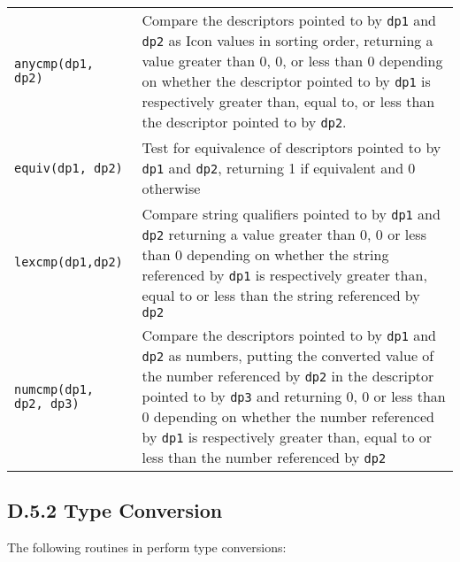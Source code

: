 \begin{xtabular}{l@{\hspace{1cm}}p{11cm}}

\texttt{anycmp(dp1, dp2)} &
Compare the descriptors pointed to by \texttt{dp1} and \texttt{dp2} as Icon
values in sorting order, returning a value greater than 0, 0, or less than 0
depending on whether the descriptor pointed to by \texttt{dp1} is respectively greater
than, equal to, or less than the descriptor pointed to by \texttt{dp2}.\\

\texttt{equiv(dp1, dp2)} &
Test for equivalence of descriptors pointed to by \texttt{dp1} and \texttt{dp2},
returning 1 if equivalent and 0 otherwise\\

\texttt{lexcmp(dp1,dp2)} &
Compare string qualifiers pointed to by \texttt{dp1} and \texttt{dp2} returning
a value greater than 0, 0 or less than 0 depending on whether the string
referenced by \texttt{dp1} is respectively greater than, equal to or less than
the string referenced by \texttt{dp2}\\

\texttt{numcmp(dp1, dp2, dp3)} &
Compare the descriptors pointed to by \texttt{dp1} and \texttt{dp2} as numbers,
putting the converted value of the number referenced by \texttt{dp2} in the
descriptor pointed to by \texttt{dp3} and returning 0, 0 or less than 0
depending on whether the number referenced by \texttt{dp1} is respectively
greater than, equal to or less than the number referenced by \texttt{dp2}\\

\end{xtabular}

\subsection[D.5.2 Type Conversion]{D.5.2 Type Conversion}

The following routines in  perform type conversions:

